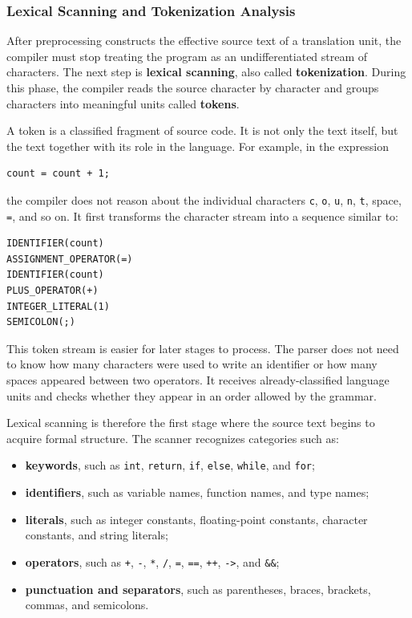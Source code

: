 \subsubsection{Lexical Scanning and Tokenization Analysis}

After preprocessing constructs the effective source text of a translation unit, the compiler must stop treating the program as an undifferentiated stream of characters. The next step is \textbf{lexical scanning}, also called \textbf{tokenization}. During this phase, the compiler reads the source character by character and groups characters into meaningful units called \textbf{tokens}.

A token is a classified fragment of source code. It is not only the text itself, but the text together with its role in the language. For example, in the expression

\begin{verbatim}
count = count + 1;
\end{verbatim}

the compiler does not reason about the individual characters \texttt{c}, \texttt{o}, \texttt{u}, \texttt{n}, \texttt{t}, space, \texttt{=}, and so on. It first transforms the character stream into a sequence similar to:

\begin{verbatim}
IDENTIFIER(count)
ASSIGNMENT_OPERATOR(=)
IDENTIFIER(count)
PLUS_OPERATOR(+)
INTEGER_LITERAL(1)
SEMICOLON(;)
\end{verbatim}

This token stream is easier for later stages to process. The parser does not need to know how many characters were used to write an identifier or how many spaces appeared between two operators. It receives already-classified language units and checks whether they appear in an order allowed by the grammar.

Lexical scanning is therefore the first stage where the source text begins to acquire formal structure. The scanner recognizes categories such as:

\begin{itemize}
    \item \textbf{keywords}, such as \texttt{int}, \texttt{return}, \texttt{if}, \texttt{else}, \texttt{while}, and \texttt{for};
    \item \textbf{identifiers}, such as variable names, function names, and type names;
    \item \textbf{literals}, such as integer constants, floating-point constants, character constants, and string literals;
    \item \textbf{operators}, such as \texttt{+}, \texttt{-}, \texttt{*}, \texttt{/}, \texttt{=}, \texttt{==}, \texttt{++}, \texttt{->}, and \texttt{\&\&};
    \item \textbf{punctuation and separators}, such as parentheses, braces, brackets, commas, and semicolons.
\end{itemize}

